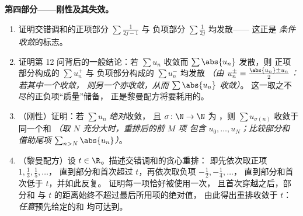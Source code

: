 \begin{problem}[{周末问题——$H_n = \ln n + \gamma +
\frac{1}{2n} + O(n^{-2})$，并将 $1 - \frac12 +
\frac13 - \dots$ 重排为 $\frac{\ln 2}{2}$}]
\medskip
\noindent\textbf{第四部分——刚性及其失效。}
\begin{enumerate}[resume]
  \item 证明交错调和的正项部分 $\sum \frac{1}{2j-1}$ 与
        负项部分 $\sum \frac{1}{2j}$ 均发散——
        这正是
        \emph{条件收敛}的标志。
  \item 证明第 12 问背后的一般结论：若
        $\sum u_n$ 收敛而 $\sum \abs{u_n}$ 发散，则
        正项部分构成的 $\sum u_n^+$ 与
        负项部分构成的 $\sum u_n^-$ 均发散 \emph{（由
        $u_n^\pm = \frac{\abs{u_n} \pm u_n}{2}$：若其中一个收敛，
        则另一个亦收敛，从而 $\sum\abs{u_n}$ 收敛）}。
        这一取之不尽的正负项“质量”储备，
        正是黎曼配方将要耗用的。
  \item （刚性）证明：若 $\sum u_n$ \emph{绝对}收敛，
        且 $\sigma \colon \N \to \N$ 为
        ，则 $\sum u_{\sigma(n)}$ 收敛于同一个和
        \emph{（取 $N$ 充分大时，重排后的前 $M$ 项
        包含 $u_0, \dots, u_N$；比较部分和
        借助尾项 $\sum_{n > N}\abs{u_n}$）}。
  \item （黎曼配方）设 $t \in \R$。描述交错调和的贪心重排：
        即先依次取正项 $1, \frac13, \frac15, \dots$，
        直到部分和首次超过 $t$，再依次取负项 $-\frac12, -\frac14, \dots$，
        直到部分和首次低于 $t$，并如此反复。
        证明每一项恰好被使用一次，
        且首次穿越之后，部分和
        与 $t$ 的距离始终不超过最后所用项的绝对值，
        由此得出重排收敛于 $t$：
        \emph{任意}预先给定的和
        均可达到。
\end{enumerate}


\end{problem}
